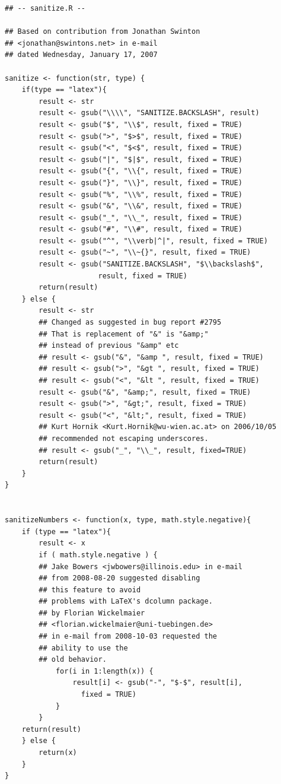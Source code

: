 \documentclass{memoir}\usepackage[]{graphicx}\usepackage[]{color}
\begin{document}
\begin{lstlisting}
## -- sanitize.R --

## Based on contribution from Jonathan Swinton
## <jonathan@swintons.net> in e-mail 
## dated Wednesday, January 17, 2007

sanitize <- function(str, type) {
    if(type == "latex"){
        result <- str
        result <- gsub("\\\\", "SANITIZE.BACKSLASH", result)
        result <- gsub("$", "\\$", result, fixed = TRUE)
        result <- gsub(">", "$>$", result, fixed = TRUE)
        result <- gsub("<", "$<$", result, fixed = TRUE)
        result <- gsub("|", "$|$", result, fixed = TRUE)
        result <- gsub("{", "\\{", result, fixed = TRUE)
        result <- gsub("}", "\\}", result, fixed = TRUE)
        result <- gsub("%", "\\%", result, fixed = TRUE)
        result <- gsub("&", "\\&", result, fixed = TRUE)
        result <- gsub("_", "\\_", result, fixed = TRUE)
        result <- gsub("#", "\\#", result, fixed = TRUE)
        result <- gsub("^", "\\verb|^|", result, fixed = TRUE)
        result <- gsub("~", "\\~{}", result, fixed = TRUE)
        result <- gsub("SANITIZE.BACKSLASH", "$\\backslash$", 
                      result, fixed = TRUE)
        return(result)
    } else {
        result <- str
        ## Changed as suggested in bug report #2795
        ## That is replacement of "&" is "&amp;"
        ## instead of previous "&amp" etc
        ## result <- gsub("&", "&amp ", result, fixed = TRUE)
        ## result <- gsub(">", "&gt ", result, fixed = TRUE)
        ## result <- gsub("<", "&lt ", result, fixed = TRUE)
        result <- gsub("&", "&amp;", result, fixed = TRUE)
        result <- gsub(">", "&gt;", result, fixed = TRUE)
        result <- gsub("<", "&lt;", result, fixed = TRUE)
        ## Kurt Hornik <Kurt.Hornik@wu-wien.ac.at> on 2006/10/05
        ## recommended not escaping underscores.
        ## result <- gsub("_", "\\_", result, fixed=TRUE)
        return(result)
    }
}


sanitizeNumbers <- function(x, type, math.style.negative){
    if (type == "latex"){
        result <- x
        if ( math.style.negative ) {
        ## Jake Bowers <jwbowers@illinois.edu> in e-mail
        ## from 2008-08-20 suggested disabling 
        ## this feature to avoid
        ## problems with LaTeX's dcolumn package.
        ## by Florian Wickelmaier 
        ## <florian.wickelmaier@uni-tuebingen.de>
        ## in e-mail from 2008-10-03 requested the 
        ## ability to use the
        ## old behavior.
            for(i in 1:length(x)) {
                result[i] <- gsub("-", "$-$", result[i], 
                  fixed = TRUE)
            }
        }
    return(result)
    } else {
        return(x)
    }
}



\end{lstlisting}
\end{document}
